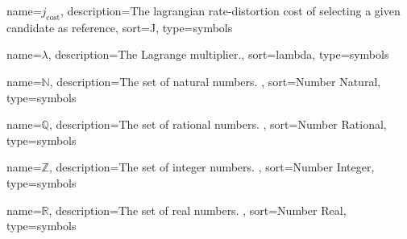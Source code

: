 
%
{%
	name={\ensuremath{j_{\text{cost}}}},
	description={The lagrangian rate-distortion cost of selecting a given candidate as reference},
	sort={J},
	type=symbols
}

%
{%
	name={\ensuremath{\lambda}},
	description={The Lagrange multiplier.},
	sort={lambda},
	type=symbols
}


%
{%
	name={\ensuremath{\mathbb{N}}},
	description={The set of natural numbers. },
	sort={Number Natural},
	type=symbols
}

%
{%
	name={\ensuremath{\mathbb{Q}}},
	description={The set of rational numbers. },
	sort={Number Rational},
	type=symbols
}

%
{%
	name={\ensuremath{\mathbb{Z}}},
	description={The set of integer numbers. },
	sort={Number Integer},
	type=symbols
}

%
{%
	name={\ensuremath{\mathbb{R}}},
	description={The set of real numbers. },
	sort={Number Real},
	type=symbols
}
